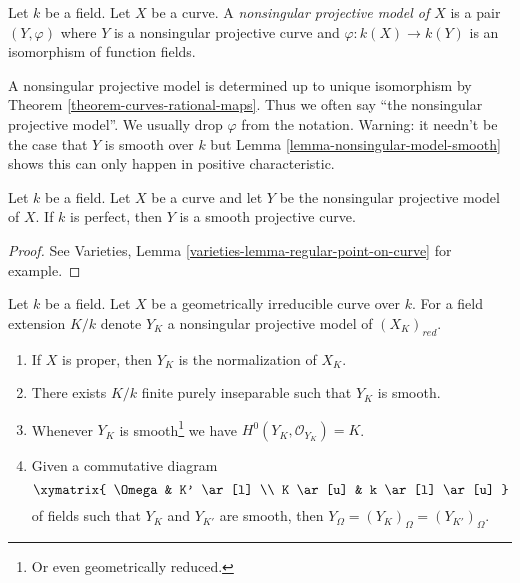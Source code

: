 \begin{definition}
\label{definition-normal-projective-model}
Let $k$ be a field. Let $X$ be a curve.
A {\it nonsingular projective model of $X$}
is a pair $(Y, \varphi)$ where $Y$ is a nonsingular projective
curve and $\varphi : k(X) \to k(Y)$ is an isomorphism
of function fields.
\end{definition}

\noindent
A nonsingular projective model is determined up to unique
isomorphism by Theorem \ref{theorem-curves-rational-maps}.
Thus we often say ``the nonsingular projective model''.
We usually drop $\varphi$ from the notation.
Warning: it needn't be the case that $Y$ is smooth over $k$
but Lemma \ref{lemma-nonsingular-model-smooth}
shows this can only happen in positive characteristic.

\begin{lemma}
\label{lemma-nonsingular-model-smooth}
Let $k$ be a field. Let $X$ be a curve and let $Y$ be the nonsingular
projective model of $X$. If $k$ is perfect, then $Y$ is a smooth
projective curve.
\end{lemma}

\begin{proof}
See Varieties, Lemma \ref{varieties-lemma-regular-point-on-curve}
for example.
\end{proof}

\begin{lemma}
\label{lemma-smooth-models}
Let $k$ be a field. Let $X$ be a geometrically irreducible curve over $k$.
For a field extension $K/k$ denote $Y_K$ a nonsingular projective model
of $(X_K)_{red}$.
\begin{enumerate}
\item If $X$ is proper, then $Y_K$ is the normalization of $X_K$.
\item There exists $K/k$ finite purely inseparable such that $Y_K$ is smooth.
\item Whenever $Y_K$ is smooth\footnote{Or even geometrically reduced.}
we have $H^0(Y_K, \mathcal{O}_{Y_K}) = K$.
\item Given a commutative diagram
$$
\xymatrix{
\Omega & K' \ar[l] \\
K \ar[u] & k \ar[l] \ar[u]
}
$$
of fields such that $Y_K$ and $Y_{K'}$ are smooth, then
$Y_\Omega = (Y_K)_\Omega = (Y_{K'})_\Omega$.
\end{enumerate}
\end{lemma}

